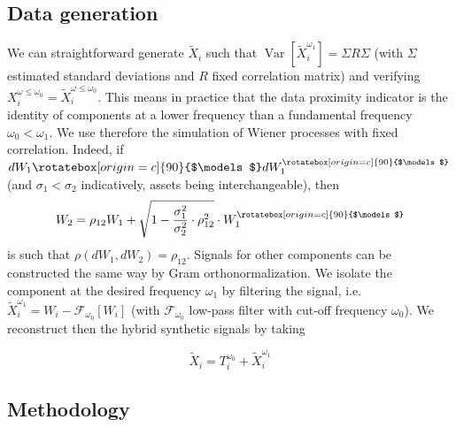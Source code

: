 \documentclass{article}
\DeclareMathOperator{\Var}{Var}
\newcommand{\Varb}[1]{\ensuremath{\Var\!\left[#1\right]}}
\newcommand{\indep}{\rotatebox[origin=c]{90}{$\models$}}
\begin{document}
\subsection*{Data generation}


We can straightforward generate $\tilde{X}_i$ such that $\Varb{\tilde{X}_i^{\omega_1}}=\Sigma R \Sigma$ (with $\Sigma$ estimated standard deviations and $R$ fixed correlation matrix) and verifying $X_i^{\omega \leq \omega_0} = \tilde{X}_i^{\omega \leq \omega_0}$. This means in practice that the data proximity indicator is the identity of components at a lower frequency than a fundamental frequency $\omega_0 < \omega_1$. We use therefore the simulation of Wiener processes with fixed correlation. Indeed, if $dW_1 \indep dW_1^{\indep}$ (and $\sigma_1 < \sigma_2$ indicatively, assets being interchangeable), then
\[
W_2 = \rho_{12}W_1 + \sqrt{1-\frac{\sigma_1^2}{\sigma_2^2}\cdot\rho_{12}^2}\cdot W_1^{\indep}
\]
is such that $\rho(dW_1,dW_2)=\rho_{12}$. Signals for other components can be constructed the same way by Gram orthonormalization. We isolate the component at the desired frequency $\omega_1$ by filtering the signal, i.e. $\tilde{X}_i^{\omega_1} = W_i - \mathcal{F}_{\omega_0}[W_i]$ (with $\mathcal{F}_{\omega_0}$ low-pass filter with cut-off frequency $\omega_0$). We reconstruct then the hybrid synthetic signals by taking
 
\begin{equation}
\tilde{X}_i = T_i^{\omega_0} + \tilde{X}_i^{\omega_1}
\end{equation}



\subsection*{Methodology}
\end{document}
